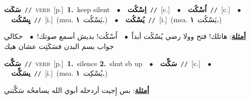 \documentclass[10pt,a4paper,twoside]{article} %
\begin{document}
\begin{multicols}{2}
{\setlength\topsep{0pt}\textbf{\foreignlanguage{arabic}{سَكَت}}\ {\color{gray}\texttt{//}\color{black}}\ \textsc{verb}\ [p.]\ \textbf{1.}~keep silent\ \ $\bullet$\ \ \setlength\topsep{0pt}\textbf{\foreignlanguage{arabic}{اِسْكُت}}\ {\color{gray}\texttt{//}\color{black}}\ [c.]\ \ $\bullet$\ \ \setlength\topsep{0pt}\textbf{\foreignlanguage{arabic}{اُسْكُت}}\ {\color{gray}\texttt{//}\color{black}}\ [c.]\ \ $\bullet$\ \ \setlength\topsep{0pt}\textbf{\foreignlanguage{arabic}{يِسْكُت}}\ {\color{gray}\texttt{//}\color{black}}\ [i.]\ \color{gray}(msa. \foreignlanguage{arabic}{يَسْكُت}~\foreignlanguage{arabic}{\textbf{١.}})\color{black}\ \ $\bullet$\ \ \setlength\topsep{0pt}\textbf{\foreignlanguage{arabic}{يُسْكُت}}\ {\color{gray}\texttt{//}\color{black}}\ [i.]\ \color{gray}(msa. \foreignlanguage{arabic}{يَسْكُت}~\foreignlanguage{arabic}{\textbf{١.}})\color{black}\  \begin{flushright}\color{gray}\foreignlanguage{arabic}{\textbf{\underline{\foreignlanguage{arabic}{أمثلة}}}: هاتلك! فتح وولا رضي يُسْكُت أبداً\ $\bullet$\ \  اُسْكُت! بديش أسمع صوتك!\ $\bullet$\ \  حكالي جواب بسم البدن فسَكَتِت عشان هيك}\end{flushright}\color{black}} \vspace{2mm}

{\setlength\topsep{0pt}\textbf{\foreignlanguage{arabic}{سَكَّت}}\ {\color{gray}\texttt{//}\color{black}}\ \textsc{verb}\ [p.]\ \textbf{1.}~silence  \textbf{2.}~shut sb up\ \ $\bullet$\ \ \setlength\topsep{0pt}\textbf{\foreignlanguage{arabic}{سَكِّت}}\ {\color{gray}\texttt{//}\color{black}}\ [c.]\ \ $\bullet$\ \ \setlength\topsep{0pt}\textbf{\foreignlanguage{arabic}{يسَكِّت}}\ {\color{gray}\texttt{//}\color{black}}\ [i.]\ \color{gray}(msa. \foreignlanguage{arabic}{يُسْكِت}~\foreignlanguage{arabic}{\textbf{١.}})\color{black}\  \begin{flushright}\color{gray}\foreignlanguage{arabic}{\textbf{\underline{\foreignlanguage{arabic}{أمثلة}}}: بس إِجيت أردحله أبوي الله يسامحُه سَكَّتني}\end{flushright}\color{black}} \vspace{2mm}


\end{multicols}
\end{document}
